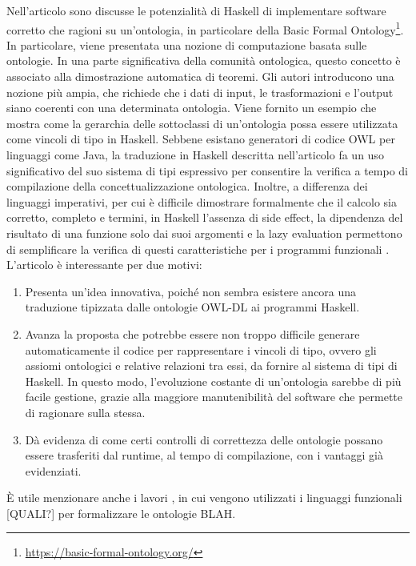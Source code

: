 Nell'articolo \cite{verifiableontologybasedcomputation} sono discusse le potenzialità di Haskell di implementare software corretto che ragioni su un'ontologia, in particolare della Basic Formal Ontology\footnote{\url{https://basic-formal-ontology.org/}}. In particolare, viene presentata una nozione di computazione basata sulle ontologie. In una parte significativa della comunità ontologica, questo concetto è associato alla dimostrazione automatica di teoremi. Gli autori introducono una nozione più ampia, che richiede che i dati di input, le trasformazioni e l'output siano coerenti con una determinata ontologia. Viene fornito un esempio che mostra come la gerarchia delle sottoclassi di un'ontologia possa essere utilizzata come vincoli di tipo in Haskell. Sebbene esistano generatori di codice OWL per linguaggi come Java, la traduzione in Haskell descritta nell'articolo fa un uso significativo del suo sistema di tipi espressivo per consentire la verifica a tempo di compilazione della concettualizzazione ontologica. Inoltre, a differenza dei linguaggi imperativi, per cui è difficile dimostrare formalmente che il calcolo sia corretto, completo e termini, in Haskell l'assenza di side effect, la dipendenza del risultato di una funzione solo dai suoi argomenti e la lazy evaluation permettono di semplificare la verifica di questi caratteristiche per i programmi funzionali \cite{hugheswhyFPMatters}. L'articolo è interessante per due motivi:
\begin{enumerate}
	\item Presenta un'idea innovativa, poiché non sembra esistere ancora una traduzione tipizzata dalle ontologie OWL-DL ai programmi Haskell.
	\item Avanza la proposta che potrebbe essere non troppo difficile generare automaticamente il codice per rappresentare i vincoli di tipo, ovvero gli assiomi ontologici e relative relazioni tra essi, da fornire al sistema di tipi di Haskell. In questo modo, l'evoluzione costante di un'ontologia sarebbe di più facile gestione, grazie alla maggiore manutenibilità del software che permette di ragionare sulla stessa.
	\item Dà evidenza di come certi controlli di correttezza delle ontologie possano essere trasferiti dal runtime, al tempo di compilazione, con i vantaggi già evidenziati.
\end{enumerate}

È utile menzionare anche i lavori \cite{...}, in cui vengono utilizzati i linguaggi funzionali [QUALI?] per formalizzare le ontologie BLAH.


